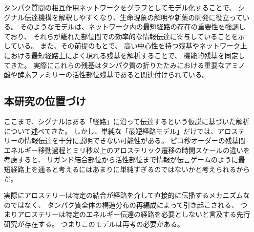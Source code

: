 タンパク質間の相互作用ネットワークをグラフとしてモデル化することで、
シグナル伝達機構を解釈しやすくなり、生命現象の解明や新薬の開発に役立っている。
そのようなモデルは、ネットワーク内の最短経路の存在の重要性を強調\cite{Ghosh2007}しており、
それらが離れた部位間での効率的な情報伝達に寄与していることを示している。
また、その前提のもとで、
高い中心性を持つ残基\cite{amitai2004}やネットワーク上における最短経路上によく現れる残基\cite{delsol2006}を解析することで、
機能的残基を同定してきた。
実際にこれらの残基はタンパク質の折りたたみにおける重要なアミノ酸や酵素ファミリーの活性部位残基であると関連付けられている。

\subsection{本研究の位置づけ}
ここまで、シグナルはある「経路」に沿って伝達するという仮説に基づいた解析について述べてきた。
しかし、単純な「最短経路モデル」だけでは、アロステリーの情報伝達を十分に説明できない可能性がある。
ピコ秒オーダーの残基間エネルギー移動過程\cite{Lim1996}とミリ秒以上のアロステリック遷移\cite{Changeux2005}の時間スケールの違いを考慮すると、
リガンド結合部位から活性部位まで情報が伝言ゲームのように最短経路上を通ると考えるにはあまりに単純すぎるのではないかと考えられるからだ。

実際にアロステリーは特定の結合が経路を介して直接的に伝播するメカニズムなのではなく、
タンパク質全体の構造分布の再編成によって引き起こされる、
つまりアロステリーは特定のエネルギー伝達の経路を必要としないと言及する先行研究\cite{Hilser2007}\cite{Pan2000}が存在する。
つまりこのモデルは再考の必要がある。

